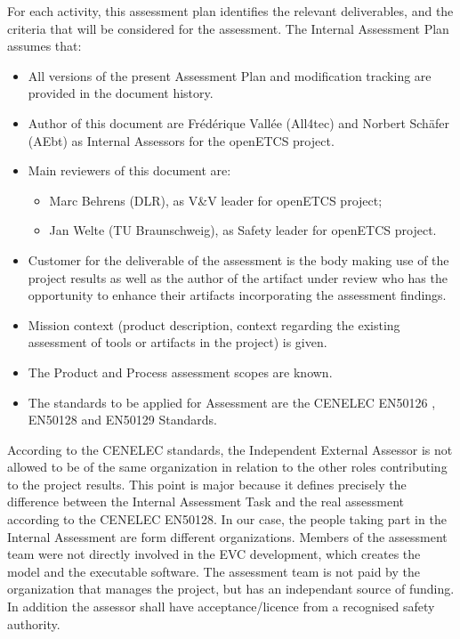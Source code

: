 \documentclass[openetcs]{template/openetcs_article}
\begin{document}
For each activity, this assessment plan identifies the relevant deliverables, and the criteria that will be considered for the assessment.
The Internal Assessment Plan assumes that: 
\begin{itemize}
\item All versions of the present Assessment Plan and modification tracking are provided in the document history.
\item Author of this document are Fr\'ed\'erique Vall\'ee (All4tec) and Norbert Sch\"afer (AEbt) as Internal Assessors for the openETCS project.
\item Main reviewers of this document are:
	\begin{itemize}
	\item Marc Behrens (DLR), as V\&V leader for openETCS project;
	\item Jan Welte (TU Braunschweig), as Safety leader for openETCS project.
	\end{itemize}
\item Customer for the deliverable of the assessment is the body making use of the project results as well as the author of the artifact under review who has the opportunity to enhance their artifacts incorporating the assessment findings.
\item Mission context (product description, context regarding the existing assessment of tools or artifacts in the project) is given.
\item The Product and Process assessment scopes are known.
\item The standards to be applied for Assessment are the CENELEC EN50126 \cite{EN50126} , EN50128 \cite{EN50128} and EN50129 \cite{EN50129} Standards.
\end{itemize}

According to the CENELEC standards, the Independent External Assessor is not allowed to be of the same organization in relation to the other roles contributing
to the project results.
This point is major because it defines precisely the difference between the Internal Assessment Task and the real assessment according to the CENELEC EN50128.
In our case, the people taking part in the Internal Assessment are form different organizations. Members of the assessment team were not directly involved in the EVC development, which creates the model and the executable software. The assessment team is not paid by the organization that manages the project, but has an independant source of funding. In addition the assessor shall have acceptance/licence from a recognised safety authority.
\end{document}

